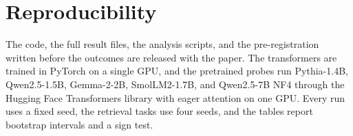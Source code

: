 \documentclass[letterpaper]{article} %
\begin{document}
\section*{Reproducibility}
The code, the full result files, the analysis scripts, and the pre-registration written before the outcomes
are released with the paper.
The transformers are trained in PyTorch on a single GPU, and the pretrained probes run Pythia-1.4B,
Qwen2.5-1.5B, Gemma-2-2B, SmolLM2-1.7B, and Qwen2.5-7B NF4 through the Hugging Face Transformers library with eager
attention on one GPU.
Every run uses a fixed seed, the retrieval tasks use four seeds, and the tables report bootstrap intervals
and a sign test.


\end{document}
